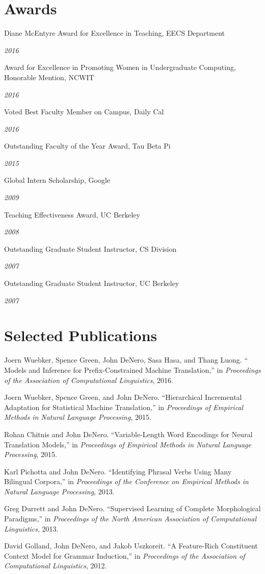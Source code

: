 \documentclass[margin,line]{res}
\newcommand{\dated}[2]{\parbox[t]{4.4in}{#1} \hspace{0.4in}
											 \parbox[t]{1in}{ {\it #2 } } }
\begin{document}
\begin{resume}
\section{\sc Awards}

	\dated{Diane McEntyre Award for Excellence in Teaching, EECS Department} { 2016 }

	\dated{Award for Excellence in Promoting Women in Undergraduate Computing, Honorable Mention, NCWIT} { 2016 }

	\dated{Voted Best Faculty Member on Campus, Daily Cal} { 2016 }

	\dated{Outstanding Faculty of the Year Award, Tau Beta Pi} { 2015 }

	\dated{Global Intern Scholarship, Google} { 2009 }

	\dated{Teaching Effectiveness Award, UC Berkeley} { 2008 }

	\dated{Outstanding Graduate Student Instructor, CS Division} { 2007 }

	\dated{Outstanding Graduate Student Instructor, UC Berkeley} { 2007 }

\section{\sc Selected Publications}

\small

Joern Wuebker, Spence Green, John DeNero, Sasa Hasa, and Thang Luong. `` Models and Inference for Prefix-Constrained Machine Translation,'' in {\it Proceedings of the Association of Computational Linguistics}, 2016.

Joern Wuebker, Spence Green, and John DeNero. ``Hierarchical Incremental Adaptation for Statistical Machine Translation,'' in {\it Proceedings of Empirical Methods in Natural Language Processing}, 2015.

Rohan Chitnis and John DeNero. ``Variable-Length Word Encodings for Neural Translation Models,'' in {\it Proceedings of Empirical Methods in Natural Language Processing}, 2015.

Karl Pichotta and John DeNero.  ``Identifying Phrasal Verbs Using Many Bilingual Corpora,'' in {\it Proceedings of the Conference on Empirical Methods in Natural Language Processing}, 2013.

Greg Durrett and John DeNero.  ``Supervised Learning of Complete Morphological Paradigms,'' in {\it Proceedings of the North American Association of Computational Linguistics}, 2013.

David Golland, John DeNero, and Jakob Uszkoreit. ``A Feature-Rich Constituent Context Model for Grammar Induction,'' in {\it Proceedings of the Association of Computational Linguistics}, 2012.


\end{resume}
\end{document}
